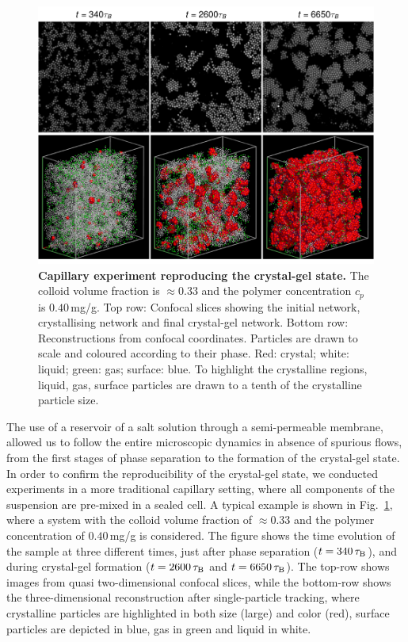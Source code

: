\begin{figure}[!t]
\includegraphics{capillary.pdf}
\caption{\textbf{Capillary experiment reproducing the crystal-gel state.} The colloid volume fraction is $\approx 0.33$ and the polymer concentration $c_p$ is $0.40\,$mg/g. Top row: Confocal slices showing the initial network, crystallising network and final crystal-gel network. Bottom row: Reconstructions from confocal coordinates. Particles are drawn to scale and coloured according to their phase. Red: crystal; white: liquid; green: gas; surface: blue. To highlight the crystalline regions, liquid, gas, surface particles are drawn to a tenth of the crystalline particle size.}
\label{fig:capillary}
\end{figure}


The use of a reservoir of a salt solution through a semi-permeable membrane, allowed us to follow the entire microscopic dynamics in absence of spurious flows, from the first stages of phase separation to the formation of the crystal-gel state. In order to confirm the reproducibility of the crystal-gel state, we conducted experiments in a more traditional capillary setting, where all components of the suspension are pre-mixed in a sealed cell. A typical example is
shown in Fig.~\ref{fig:capillary}, where a system with the colloid volume fraction of $\approx 0.33$ and the polymer concentration of $0.40\,$mg/g is considered.
The figure shows the time evolution of the sample at three different times, just after phase separation ($t=340\,\tau_{\rm B}$), and during
crystal-gel formation ($t=2600\,\tau_{\rm B}$ and $t=6650\,\tau_{\rm B}$). The top-row shows images from quasi two-dimensional confocal slices, while the bottom-row shows
the three-dimensional reconstruction after single-particle tracking, where crystalline particles are highlighted in both size (large) and color (red), surface particles
are depicted in blue, gas in green and liquid in white.

